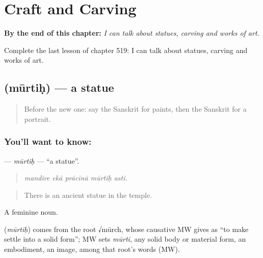 
\chapter{Craft and Carving}
\label{ch:sa-craft-and-carving}

\begin{chapteropening}
\textbf{By the end of this chapter:} \emph{I can talk about statues, carving and works of art.}

Complete the last lesson of chapter 519: I can talk about statues, carving and works of art.
\end{chapteropening}

\section[\texorpdfstring{\sk{मूर्तिः} (mūrtiḥ)}{मूर्तिः (mūrtiḥ)}]{ (mūrtiḥ) — a statue}

\label{lesson:SA-C519-murtih}



\begin{quote}
Before the new one: say the Sanskrit for paints, then the Sanskrit for a portrait.
\end{quote}

\subsection*{You'll want to know: }
\textbf{} — \emph{mūrtiḥ} — \textquotedblleft{}a statue\textquotedblright{}.

\begin{quote}
    
\end{quote}

\begin{quote}
\emph{mandire ekā prācīnā mūrtiḥ asti.}
\end{quote}

\begin{quote}
There is an ancient statue in the temple.
\end{quote}

A feminine noun.

\begin{cousinweb}
\textbf{} (\emph{mūrtiḥ}) comes from the root √mūrch, whose causative MW gives as \textquotedblleft{}to make settle into a solid form\textquotedblright{}; MW sets \emph{mūrti}, any solid body or material form, an embodiment, an image, among that root's words (MW).
\end{cousinweb}

